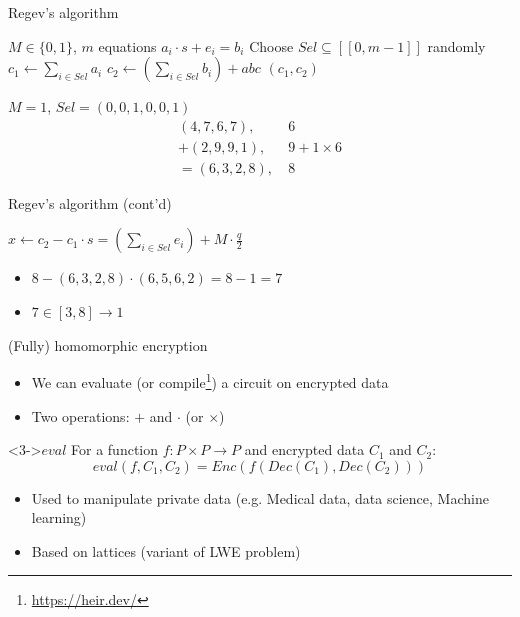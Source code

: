 \documentclass{beamer}
\providecommand{\floor}[1]{\left \lfloor #1 \right \rfloor }
\begin{document}
\begin{frame}{Regev's algorithm}
	\begin{algorithm}[H]
		\caption{Encryption}\label{algo:regev}
		\begin{algorithmic}
			\Require $M\in\{0, 1\}$, $m$ equations $a_i \cdot s + e_i = b_i$
			\State Choose $Sel\subseteq[\![0, m-1]\!]$ randomly
			\State $c_1 \gets \displaystyle\sum_{i\in Sel} a_i$
			\State $c_2 \gets \left(\displaystyle\sum_{i\in Sel} b_i\right) + abc$
			\State \Return $(c_1, c_2)$
		\end{algorithmic}
	\end{algorithm}
		$M = 1$, $Sel = (0, 0, 1, 0, 0, 1)$
		\begin{align*}
			(4, 7, 6, 7), &\ 6 \\
			+ (2, 9, 9, 1), &\ 9 + 1 \times 6 \\
			= (6, 3, 2, 8), &\ 8
		\end{align*}
\end{frame}

\begin{frame}{Regev's algorithm (cont'd)}
	\begin{algorithm}[H]
		\caption{Decryption}\label{algo:regev}
		\begin{algorithmic}
			\State $x \gets c_2 - c_1 \cdot s = \left(\displaystyle\sum_{i\in Sel} e_i\right) + M\cdot\frac{q}{2}$ %
			\If{$x\in \left[\floor{\frac{q}{4}}, \floor{\frac{3q}{4}} - 1\right]$}
				\State \Return 1
			\Else
				\State \Return 0
			\EndIf
		\end{algorithmic}
	\end{algorithm}
	\begin{itemize}
		\item $8 - (6, 3, 2, 8) \cdot (6, 5, 6, 2) = 8 - 1 = 7$
		\item $7 \in [3, 8] \rightarrow 1$
	\end{itemize}
\end{frame}

\begin{frame}{(Fully) homomorphic encryption}
	\begin{itemize}
		\item We can evaluate (or compile\footnote{\url{https://heir.dev/}}) a circuit on encrypted data
		\item<2-> Two operations: $+$ and $\cdot$ (or $\times$)
	\end{itemize}
	\begin{block}<3->{$eval$}
		For a function $f : P \times P \rightarrow P$ and encrypted data $C_1$ and $C_2$:
		\[eval(f, C_1, C_2) = Enc(f(Dec(C_1), Dec(C_2)))\]
	\end{block}
	\begin{itemize}
		\item<4-> Used to manipulate private data (e.g. Medical data, data science, Machine learning)
		\item<5-> Based on lattices (variant of LWE problem)
	\end{itemize}
\end{frame}
\end{document}
